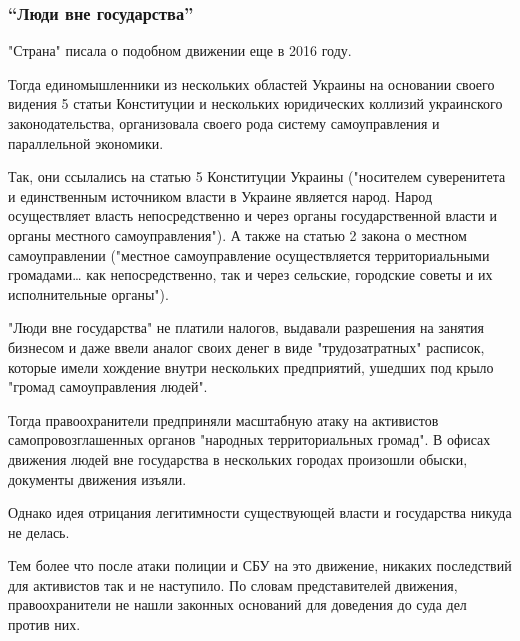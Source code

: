  
 
 
 
 
\subsubsection{\enquote{Люди вне государства}}
\label{sec:22_12_2020.news.ua.strana.sibircev_aleksandr.1.ukraina_respublika.ludi_vne_gosudarstva}

"Страна" писала о подобном движении еще в 2016 году.

Тогда единомышленники из нескольких областей Украины на основании своего
видения 5 статьи Конституции и нескольких юридических коллизий украинского
законодательства, организовала своего рода систему самоуправления и
параллельной экономики.

Так, они ссылались на статью 5 Конституции Украины ("носителем
суверенитета и единственным источником власти в Украине является народ.
Народ осуществляет власть непосредственно и через органы государственной
власти и органы местного самоуправления"). А также на статью 2 закона о
местном самоуправлении ("местное самоуправление осуществляется
территориальными громадами… как непосредственно, так и через сельские,
городские советы и их исполнительные органы"). 

"Люди вне государства" не платили налогов, выдавали разрешения на занятия
бизнесом и даже ввели аналог своих денег в виде "трудозатратных" расписок,
которые имели хождение внутри нескольких предприятий, ушедших под крыло
"громад самоуправления людей".

Тогда правоохранители предприняли масштабную атаку на активистов
самопровозглашенных органов "народных территориальных громад". В офисах
движения людей вне государства в нескольких городах произошли обыски,
документы движения изъяли.

Однако идея отрицания легитимности существующей власти и государства
никуда не делась.

Тем более что после атаки полиции и СБУ на это движение, никаких
последствий для активистов так и не наступило. По словам представителей
движения, правоохранители не нашли законных оснований для доведения до
суда дел против них. 

